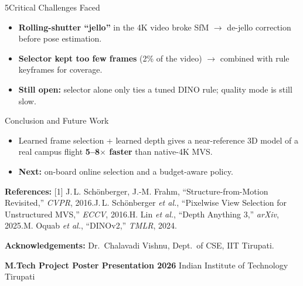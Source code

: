 \documentclass{article}
\newcommand{\affilsize}{\fontsize{22}{29}\selectfont}
\newcommand{\smallsize}{\fontsize{13.5}{17}\selectfont}
\newcommand{\subhead}[1]{{\color{iitmaroon}\bfseries #1}}
\begin{document}
\begin{minipage}[t]{0.488\textwidth}
\begin{posterblock}{5}{Critical Challenges Faced}
\begin{itemize}
  \item \textbf{Rolling-shutter ``jello''} in the 4K video broke SfM
        $\rightarrow$ de-jello correction before pose estimation.
  \item \textbf{Selector kept too few frames} (2\% of the video)
        $\rightarrow$ combined with rule keyframes for coverage.
  \item \textbf{Still open:} selector alone only ties a tuned DINO rule; quality mode is still slow.
\end{itemize}
\end{posterblock}

\begin{posterblock}{}{Conclusion and Future Work}
\begin{itemize}
  \item Learned frame selection + learned depth gives a near-reference 3D model of a
        real campus flight \textbf{5--8$\times$ faster} than native-4K MVS.
  \item \textbf{Next:} on-board online selection and a budget-aware policy.
\end{itemize}
{\smallsize
\subhead{References:}
[1] J.\,L. Sch\"onberger, J.-M. Frahm, ``Structure-from-Motion Revisited,'' \emph{CVPR}, 2016.\;
[2] J.\,L. Sch\"onberger \emph{et al.}, ``Pixelwise View Selection for Unstructured MVS,'' \emph{ECCV}, 2016.\;
[3] H. Lin \emph{et al.}, ``Depth Anything 3,'' \emph{arXiv}, 2025.\;
[4] M. Oquab \emph{et al.}, ``DINOv2,'' \emph{TMLR}, 2024.\par
\subhead{Acknowledgements:} Dr.\ Chalavadi Vishnu, Dept.\ of CSE, IIT Tirupati.\par}
\end{posterblock}
\end{minipage}

\vfill
\begin{tcolorbox}[enhanced, colback=iitmaroon, colframe=iitmaroon, arc=0pt,
  boxrule=0pt, left=16pt, right=16pt, top=7pt, bottom=7pt,
  fontupper=\affilsize\color{white}]
\textbf{M.Tech Project Poster Presentation 2026} \hfill
Indian Institute of Technology Tirupati
\end{tcolorbox}
\end{document}
